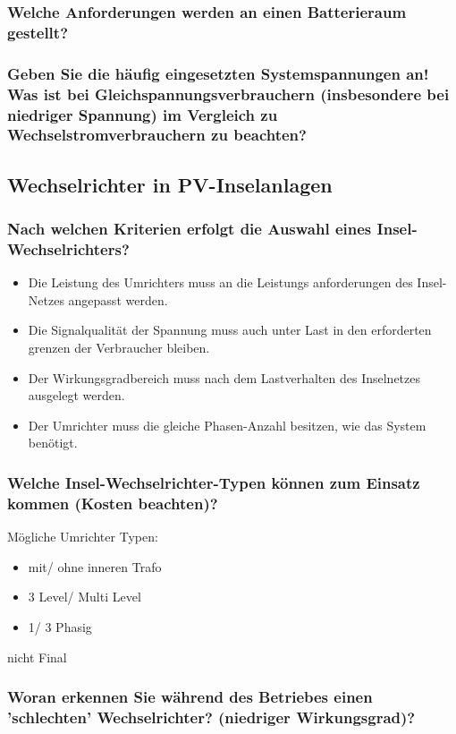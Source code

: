 \subsubsection{Welche Anforderungen werden an einen Batterieraum gestellt?}
\blindtext
\subsubsection{Geben Sie die häufig eingesetzten Systemspannungen an! Was ist bei Gleichspannungsverbrauchern (insbesondere bei niedriger Spannung) im Vergleich zu Wechselstromverbrauchern zu beachten?}
\blindtext

\subsection{Wechselrichter in PV-Inselanlagen}
\subsubsection{Nach welchen Kriterien erfolgt die Auswahl eines Insel-Wechselrichters?}
\begin{itemize}
    \item Die Leistung des Umrichters muss an die Leistungs anforderungen des Insel-Netzes angepasst werden.
    \item Die Signalqualität der Spannung muss auch unter Last in den erforderten grenzen der Verbraucher bleiben.
    \item Der Wirkungsgradbereich muss nach dem Lastverhalten des Inselnetzes ausgelegt werden.
    \item Der Umrichter muss die gleiche Phasen-Anzahl besitzen, wie das System benötigt.
\end{itemize}
\subsubsection{Welche Insel-Wechselrichter-Typen können zum Einsatz kommen (Kosten beachten)?}
Mögliche Umrichter Typen:
\begin{itemize}
    \item mit/ ohne inneren Trafo
    \item 3 Level/ Multi Level
    \item 1/ 3 Phasig
\end{itemize} 
{\Huge nicht Final} %
\subsubsection{Woran erkennen Sie während des Betriebes einen 'schlechten' Wechselrichter? (niedriger Wirkungsgrad)?}

